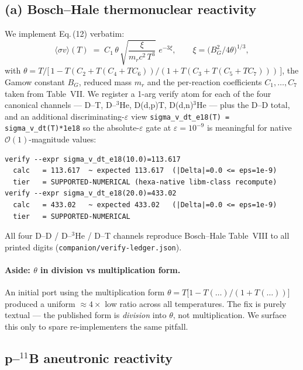\documentclass[11pt,a4paper]{article}
\begin{document}
\subsection{(a) Bosch--Hale thermonuclear reactivity}

We implement \citet{boschhale1992} Eq.\,(12) verbatim:
\begin{equation}
\langle\sigma v\rangle(T) \;=\; C_1\,\theta\,
  \sqrt{\frac{\xi}{m_r c^2\,T^3}}\;e^{-3\xi},
\qquad
\xi=\bigl(B_G^{2}/4\theta\bigr)^{1/3},
\label{eq:boschhale}
\end{equation}
with
$\theta = T/\bigl[\,1 - T(C_2+T(C_4+TC_6))/(1+T(C_3+T(C_5+TC_7)))\,\bigr]$,
the Gamow constant $B_G$, reduced mass $m_r$ and the per-reaction
coefficients $C_1,\dots,C_7$ taken from \citep{boschhale1992}
Table~VII. We register a 1-arg verify atom for each of the four
canonical channels --- D--T, D--$^3$He, D(d,p)T, D(d,n)$^3$He --- plus
the D--D total, and an additional discriminating-$\varepsilon$ view
\verb|sigma_v_dt_e18(T) = sigma_v_dt(T)*1e18| so the
absolute-$\varepsilon$ gate at $\varepsilon=10^{-9}$ is meaningful for
native $\mathcal{O}(1)$-magnitude values:
\begin{lstlisting}
verify --expr sigma_v_dt_e18(10.0)=113.617
  calc   = 113.617  ~ expected 113.617  (|Delta|=0.0 <= eps=1e-9)
  tier   = SUPPORTED-NUMERICAL (hexa-native libm-class recompute)
verify --expr sigma_v_dt_e18(20.0)=433.02
  calc   = 433.02   ~ expected 433.02   (|Delta|=0.0 <= eps=1e-9)
  tier   = SUPPORTED-NUMERICAL
\end{lstlisting}
All four D--D / D--$^3$He / D--T channels reproduce Bosch--Hale
Table~VIII to all printed digits (\texttt{companion/verify-ledger.json}).

\paragraph{Aside: $\theta$ in division vs multiplication form.}
An initial port using the multiplication form
$\theta = T\bigl[1 - T(\dots)/(1+T(\dots))\bigr]$ produced a uniform
$\approx 4\times$ low ratio across all temperatures. The fix is purely
textual --- the published form is \emph{division} into $\theta$, not
multiplication. We surface this only to spare re-implementers the
same pitfall.

\subsection{p--$^{11}$B aneutronic reactivity}
\end{document}
